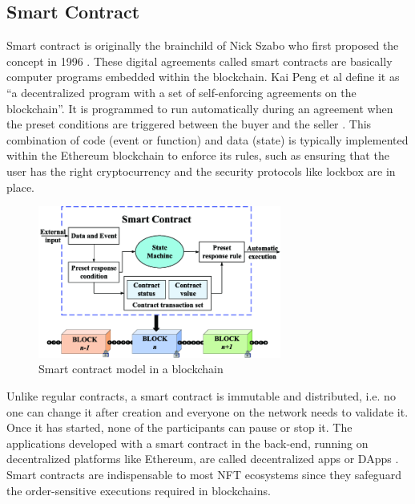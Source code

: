 \documentclass[12pt]{article}
\begin{document}
\subsection{Smart Contract}
Smart contract is originally the brainchild of Nick Szabo who first proposed the concept in 1996 \cite{szabo1996smart}. These {\color{blue} digital agreements called smart contracts are basically computer programs embedded within the blockchain. Kai Peng et al \cite{9409120} define it as “a decentralized program with a set of self-enforcing agreements on the blockchain”.} It is programmed to run automatically during an agreement when the preset conditions are triggered between the buyer and the seller \cite{chen2019secure}. This combination of code (event or function) and data (state) is typically implemented within the Ethereum blockchain \cite{ali2021introduction} to enforce its rules, such as ensuring that the user has the right cryptocurrency and the security protocols like lockbox are in place.

\begin{figure}
    \centering
    \includegraphics[width=8cm]{Smart-contract-model-based-on-energy-blockchain.png}
    \caption{Smart contract model in a blockchain \cite{chen2019secure}}
    \label{fig:smart}
\end{figure}

{\color{blue} Unlike regular contracts, a smart contract is immutable and distributed, i.e. no one can change it after creation and everyone on the network needs to validate it.} Once it has started, none of the participants can pause or stop it. The applications developed with a smart contract in the back-end, running on decentralized platforms like Ethereum, are called decentralized apps or DApps \cite{mishra2020implementation}. Smart contracts are indispensable to most NFT ecosystems since they safeguard the order-sensitive executions required in blockchains.
\end{document}
